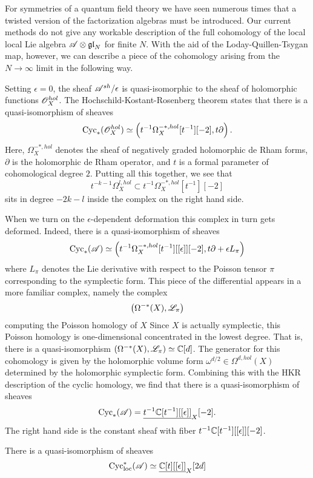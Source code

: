 For symmetries of a quantum field theory we have seen numerous times that a twisted version of the factorization algebras must be introduced. 
Our current methods do not give any workable description of the full cohomology of the local local Lie algebra $\mathscr A \otimes {\mathfrak{gl}}_N$ for finite $N$.
With the aid of the Loday-Quillen-Tsygan map, however, we can describe a piece of the cohomology arising from the $N\to \infty$ limit in the following way. 

Setting $\epsilon = 0$, the sheaf $\mathscr A^{sh} / \epsilon$ is quasi-isomorphic to the sheaf of holomorphic functions $\mathscr O^{hol}_X$. 
The Hochschild-Kostant-Rosenberg theorem states that there is a quasi-isomorphism of sheaves
\[
{\rm Cyc}_* (\mathscr O^{hol}_X) \simeq \left(t^{-1} \Omega^{-*,hol}_X [t^{-1}] [-2], t \partial\right) .
\]
Here, $\Omega^{-*,hol}_X$ denotes the sheaf of negatively graded holomorphic de Rham forms, $\partial$ is the holomorphic de Rham operator, and $t$ is a formal parameter of cohomological degree $2$. 
Putting all this together, we see that
\[
t^{-k-1} \Omega^{l,hol}_X \subset t^{-1} \Omega^{-*,hol}_X [t^{-1}] [-2]
\]
sits in degree $-2k - l$ inside the complex on the right hand side. 

When we turn on the $\epsilon$-dependent deformation this complex in turn gets deformed. 
Indeed, there is a quasi-isomorphism of sheaves
\[
{\rm Cyc}_* (\mathscr A) \simeq \left(t^{-1} \Omega^{-*,hol}_X [t^{-1}] [[\epsilon]] [-2], t \partial + \epsilon L_\pi \right) 
\] 
where $L_\pi$ denotes the Lie derivative with respect to the Poisson tensor $\pi$ corresponding to the symplectic form. 
This piece of the differential appears in a more familiar complex, namely the complex 
\[
\left(\Omega^{-*}(X), \mathscr L_\pi\right)
\]
computing the Poisson homology of $X$
Since $X$ is actually symplectic, this Poisson homology is one-dimensional concentrated in the lowest degree. 
That is, there is a quasi-isomorphism $\left(\Omega^{-*}(X), \mathscr L_\pi\right) \simeq \mathbb C [d]$. 
The generator for this cohomology is given by the holomorphic volume form $\omega^{d/2} \in \Omega^{d,hol}(X)$ determined by the holomorphic symplectic form. 
Combining this with the HKR description of the cyclic homology, we find that there is a quasi-isomorphism of sheaves
\[
{\rm Cyc}_* (\mathscr A) = \underline{t^{-1} \mathbb C[t^{-1}] [[\epsilon]]}_X [-2]  .
\]
The right hand side is the constant sheaf with fiber $t^{-1} \mathbb C[t^{-1}] [[\epsilon]] [-2]$.  

\begin{lem}
There is a quasi-isomorphism of sheaves
\[
{\rm Cyc}_{\rm loc}^*(\mathscr A) \simeq \underline{\mathbb C [t] [[\epsilon]]}_{X} [2d]
\]
\end{lem}


